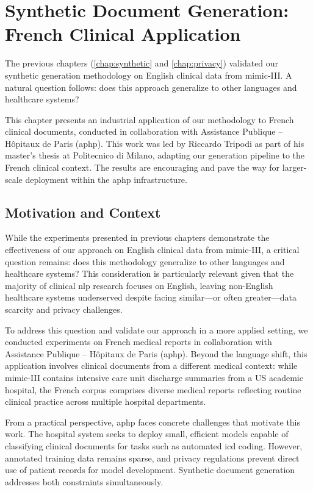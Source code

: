 \chapter{Synthetic Document Generation: French Clinical Application}
\label{chap:french-application}

The previous chapters (\autoref{chap:synthetic} and \autoref{chap:privacy}) validated our synthetic generation methodology on English clinical data from \gls{mimic}-III.
A natural question follows: does this approach generalize to other languages and healthcare systems?

This chapter presents an industrial application of our methodology to French clinical documents, conducted in collaboration with Assistance Publique -- Hôpitaux de Paris (\gls{aphp}).
This work was led by Riccardo Tripodi as part of his master's thesis at Politecnico di Milano, adapting our generation pipeline to the French clinical context.
The results are encouraging and pave the way for larger-scale deployment within the \gls{aphp} infrastructure.

\minitoc

\section{Motivation and Context}

While the experiments presented in previous chapters demonstrate the effectiveness of our approach on English clinical data from \gls{mimic}-III, a critical question remains: does this methodology generalize to other languages and healthcare systems?
This consideration is particularly relevant given that the majority of clinical \gls{nlp} research focuses on English, leaving non-English healthcare systems underserved despite facing similar---or often greater---data scarcity and privacy challenges.

To address this question and validate our approach in a more applied setting, we conducted experiments on French medical reports in collaboration with Assistance Publique -- Hôpitaux de Paris (\gls{aphp}).
Beyond the language shift, this application involves clinical documents from a different medical context: while \gls{mimic}-III contains intensive care unit discharge summaries from a US academic hospital, the French corpus comprises diverse medical reports reflecting routine clinical practice across multiple hospital departments.

From a practical perspective, \gls{aphp} faces concrete challenges that motivate this work.
The hospital system seeks to deploy small, efficient models capable of classifying clinical documents for tasks such as automated \gls{icd} coding.
However, annotated training data remains sparse, and privacy regulations prevent direct use of patient records for model development.
Synthetic document generation addresses both constraints simultaneously.

